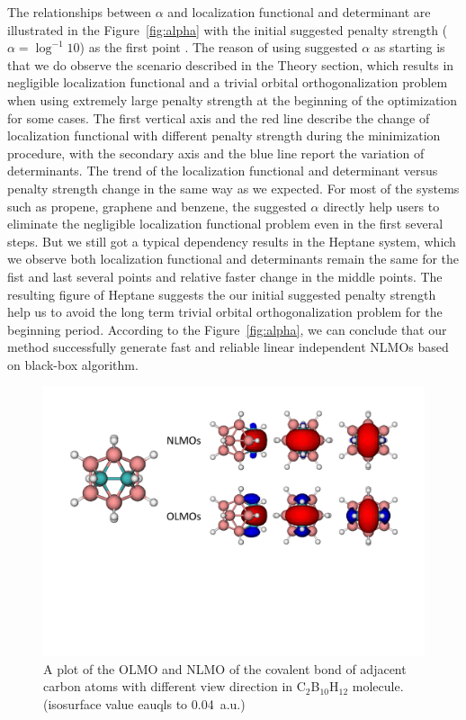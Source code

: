 \documentclass[aps,prl,reprint,amsmath,amssymb]{revtex4-1}
\begin{document}

The relationships between $\alpha$ and localization functional and determinant are illustrated in the Figure~\ref{fig:alpha} with the initial suggested penalty strength ($\alpha = \log^{-1} 10$) as the first point .
The reason of using suggested $\alpha$ as starting is that we do observe the scenario described in the Theory section, which results in negligible localization functional and a trivial orbital orthogonalization problem when using extremely large penalty strength at the beginning of the optimization for some cases.
The first vertical axis and the red line describe the change of localization functional with different penalty strength during the minimization procedure, with the secondary axis and the blue line report the variation of determinants.
The trend of the localization functional and determinant versus penalty strength change in the same way as we expected.
For most of the systems such as propene, graphene and benzene, the suggested $\alpha$ directly help users to eliminate the  negligible localization functional problem even in the first several steps.  
But we still got a typical dependency results in the Heptane system, which we observe both localization functional and determinants remain the same for the fist and last several points and relative faster change in the middle points.
The resulting figure of Heptane suggests the our initial suggested penalty strength help us to avoid the long term trivial orbital orthogonalization problem for the beginning period.
According to the Figure~\ref{fig:alpha}, we can conclude that our method successfully generate fast and reliable linear independent NLMOs based on black-box algorithm.

\begin{figure}[hbpt]
\centering
\includegraphics[width=\textwidth]{figure_3.pdf}
\caption{A plot of the OLMO and NLMO of the covalent bond of adjacent carbon atoms with different view direction  in C$_2$B$_{10}$H$_{12}$ molecule. (isosurface value eauqls to 0.04~a.u.)}
\label{fig:boro}
\end{figure}
\end{document}
